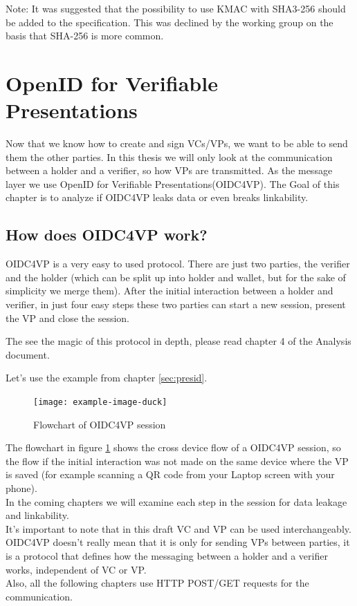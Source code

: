 \documentclass[
	a4paper               %
	,bibliography=totoc   %
	,listof=totoc         %
	,monolingual
	twoside=false,
]{bfhthesis}              %
\begin{document}
Note: It was suggested that the possibility to use KMAC with SHA3-256 should be added to the specification. This was declined by the working group on the basis that SHA-256 is more common.

\section{OpenID for Verifiable Presentations}
Now that we know how to create and sign VCs/VPs, we want to be able to send them the other parties.
In this thesis we will only look at the communication between a holder and a verifier, so how VPs are transmitted.
As the message layer we use OpenID for Verifiable Presentations(OIDC4VP)\cite{oidc4vp}.
The Goal of this chapter is to analyze if OIDC4VP leaks data or even breaks linkability.

\subsection{How does OIDC4VP work?}
OIDC4VP is a very easy to used protocol.
There are just two parties, the verifier and the holder (which can be split up into holder and wallet, but for the sake of simplicity we merge them).
After the initial interaction between a holder and verifier, in just four easy steps these two parties can start a new session, present the VP and close the session.

The see the magic of this protocol in depth, please read chapter 4 of the Analysis document.

Let's use the example from chapter \ref{sec:presid}.

\begin{figure}[h]
	\centering
	\texttt{[image: example-image-duck]}
	\label{fig:flowvp}
	\caption{Flowchart of OIDC4VP session}
\end{figure}

The flowchart in figure \ref{fig:flowvp} shows the cross device flow of a OIDC4VP session, so the flow if the initial interaction was not made on the same device where the VP is saved (for example scanning a QR code from your Laptop screen with your phone).\\
In the coming chapters we will examine each step in the session for data leakage and linkability.\\
It's important to note that in this draft VC and VP can be used interchangeably.
OIDC4VP doesn't really mean that it is only for sending VPs between parties, it is a protocol that defines how the messaging between a holder and a verifier works, independent of VC or VP.\\
Also, all the following chapters use HTTP POST/GET requests for the communication.
\end{document}
